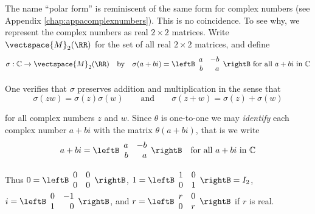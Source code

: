The name ``polar form'' is reminiscent of
the same form for complex numbers (see Appendix \ref{chap:appacomplexnumbers}). This is no coincidence.
To see why, we represent the complex numbers as real $2\times 2$ matrices.
Write $\vectspace{M}_{2}(\RR)$ for the set of all real $2\times 2$ matrices, and
define 
\begin{equation*}
\sigma :\mathbb{C}\rightarrow \vectspace{M}_{2}(\RR)\quad \mbox{by} \quad
\sigma (a+bi)=
\leftB 
\begin{array}{rr}
a & -b \\ 
b & a
\end{array}
\rightB  \mbox{ for all } a+bi \mbox{ in } \mathbb{C}
\end{equation*}

\noindent One verifies that $\sigma $ preserves addition and multiplication
in the sense that 
\begin{equation*}
\sigma (zw)=\sigma (z)\sigma (w)\qquad \mbox{and}\qquad \sigma
(z+w)=\sigma (z)+\sigma (w)
\end{equation*}

\noindent for all complex numbers $z$ and $w$. Since $\theta $ is one-to-one
we may \emph{identify} each complex number $a+bi$ with the matrix $\theta (a+bi)$, that is we write 
\begin{equation*}
a+bi=
\leftB 
\begin{array}{rr}
a & -b \\ 
b & a
\end{array}
\rightB  \quad \mbox{for all } a+bi \mbox{ in } \mathbb{C}
\end{equation*}

\noindent Thus $0=
\leftB 
\begin{array}{cc}
0 & 0 \\ 
0 & 0
\end{array}
\rightB$, $1=
\leftB 
\begin{array}{cc}
1 & 0 \\ 
0 & 1
\end{array}
\rightB =I_{2}$, $i=
\leftB 
\begin{array}{rr}
0 & -1 \\ 
1 & 0
\end{array}
\rightB$, and $r =
\leftB 
\begin{array}{cc}
r & 0 \\ 
0 & r
\end{array}
\rightB $ if $r$ is real. 

